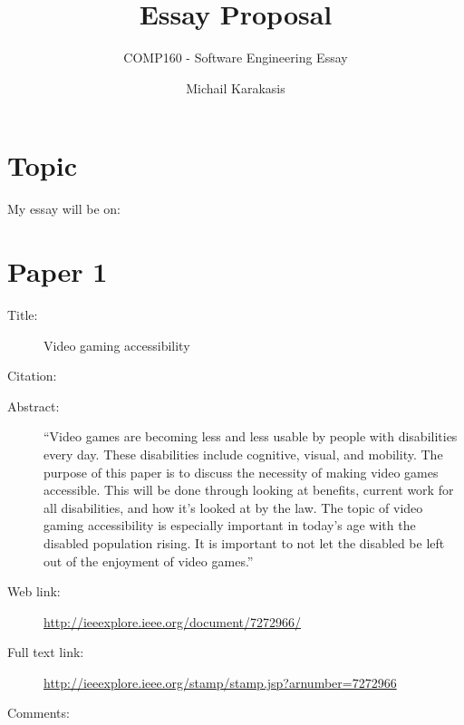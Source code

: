\documentclass{scrartcl}
\title{Essay Proposal}
\subtitle{COMP160 - Software Engineering Essay}
\author{Michail Karakasis}
\begin{document}
\maketitle

\section*{Topic}

My essay will be on:


\section*{Paper 1}
\begin{description}
\item[Title:] Video gaming accessibility
\item[Citation:] \cite{McPheron}
\item[Abstract:] ``Video games are becoming less and less usable by people with disabilities every day. These disabilities include cognitive, visual, and mobility. The purpose of this paper is to discuss the necessity of making video games accessible. This will be done through looking at benefits, current work for all disabilities, and how it's looked at by the law. The topic of video gaming accessibility is especially important in today's age with the disabled population rising. It is important to not let the disabled be left out of the enjoyment of video games.''
\item[Web link:] \url {http://ieeexplore.ieee.org/document/7272966/}
\item[Full text link:] \url {http://ieeexplore.ieee.org/stamp/stamp.jsp?arnumber=7272966}
\item[Comments:] 
\end{description}
\end{document}
